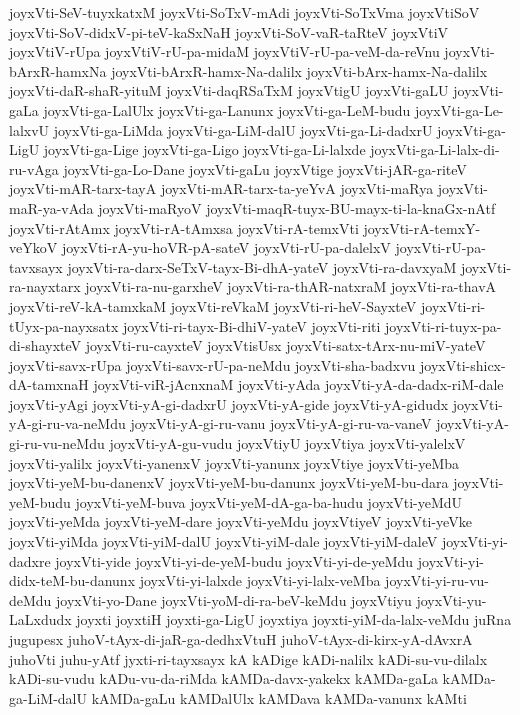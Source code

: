 {joyxVti-SeV-tuyxkatxM
joyxVti-SoTxV-mAdi
joyxVti-SoTxVma
joyxVtiSoV
joyxVti-SoV-didxV-pi-teV-kaSxNaH
joyxVti-SoV-vaR-taRteV
joyxVtiV
joyxVtiV-rUpa
joyxVtiV-rU-pa-midaM
joyxVtiV-rU-pa-veM-da-reVnu
joyxVti-bArxR-hamxNa
joyxVti-bArxR-hamx-Na-dalilx
joyxVti-bArx-hamx-Na-dalilx
joyxVti-daR-shaR-yituM
joyxVti-daqRSaTxM
joyxVtigU
joyxVti-gaLU
joyxVti-gaLa
joyxVti-ga-LalUlx
joyxVti-ga-Lanunx
joyxVti-ga-LeM-budu
joyxVti-ga-Le-lalxvU
joyxVti-ga-LiMda
joyxVti-ga-LiM-dalU
joyxVti-ga-Li-dadxrU
joyxVti-ga-LigU
joyxVti-ga-Lige
joyxVti-ga-Ligo
joyxVti-ga-Li-lalxde
joyxVti-ga-Li-lalx-di-ru-vAga
joyxVti-ga-Lo-Dane
joyxVti-gaLu
joyxVtige
joyxVti-jAR-ga-riteV
joyxVti-mAR-tarx-tayA
joyxVti-mAR-tarx-ta-yeYvA
joyxVti-maRya
joyxVti-maR-ya-vAda
joyxVti-maRyoV
joyxVti-maqR-tuyx-BU-mayx-ti-la-knaGx-nAtf
joyxVti-rAtAmx
joyxVti-rA-tAmxsa
joyxVti-rA-temxVti
joyxVti-rA-temxY-veYkoV
joyxVti-rA-yu-hoVR-pA-sateV
joyxVti-rU-pa-dalelxV
joyxVti-rU-pa-tavxsayx
joyxVti-ra-darx-SeTxV-tayx-Bi-dhA-yateV
joyxVti-ra-davxyaM
joyxVti-ra-nayxtarx
joyxVti-ra-nu-garxheV
joyxVti-ra-thAR-natxraM
joyxVti-ra-thavA
joyxVti-reV-kA-tamxkaM
joyxVti-reVkaM
joyxVti-ri-heV-SayxteV
joyxVti-ri-tUyx-pa-nayxsatx
joyxVti-ri-tayx-Bi-dhiV-yateV
joyxVti-riti
joyxVti-ri-tuyx-pa-di-shayxteV
joyxVti-ru-cayxteV
joyxVtisUsx
joyxVti-satx-tArx-nu-miV-yateV
joyxVti-savx-rUpa
joyxVti-savx-rU-pa-neMdu
joyxVti-sha-badxvu
joyxVti-shicx-dA-tamxnaH
joyxVti-viR-jAcnxnaM
joyxVti-yAda
joyxVti-yA-da-dadx-riM-dale
joyxVti-yAgi
joyxVti-yA-gi-dadxrU
joyxVti-yA-gide
joyxVti-yA-gidudx
joyxVti-yA-gi-ru-va-neMdu
joyxVti-yA-gi-ru-vanu
joyxVti-yA-gi-ru-va-vaneV
joyxVti-yA-gi-ru-vu-neMdu
joyxVti-yA-gu-vudu
joyxVtiyU
joyxVtiya
joyxVti-yalelxV
joyxVti-yalilx
joyxVti-yanenxV
joyxVti-yanunx
joyxVtiye
joyxVti-yeMba
joyxVti-yeM-bu-danenxV
joyxVti-yeM-bu-danunx
joyxVti-yeM-bu-dara
joyxVti-yeM-budu
joyxVti-yeM-buva
joyxVti-yeM-dA-ga-ba-hudu
joyxVti-yeMdU
joyxVti-yeMda
joyxVti-yeM-dare
joyxVti-yeMdu
joyxVtiyeV
joyxVti-yeVke
joyxVti-yiMda
joyxVti-yiM-dalU
joyxVti-yiM-dale
joyxVti-yiM-daleV
joyxVti-yi-dadxre
joyxVti-yide
joyxVti-yi-de-yeM-budu
joyxVti-yi-de-yeMdu
joyxVti-yi-didx-teM-bu-danunx
joyxVti-yi-lalxde
joyxVti-yi-lalx-veMba
joyxVti-yi-ru-vu-deMdu
joyxVti-yo-Dane
joyxVti-yoM-di-ra-beV-keMdu
joyxVtiyu
joyxVti-yu-LaLxdudx
joyxti
joyxtiH
joyxti-ga-LigU
joyxtiya
joyxti-yiM-da-lalx-veMdu
juRna
jugupesx
juhoV-tAyx-di-jaR-ga-dedhxVtuH
juhoV-tAyx-di-kirx-yA-dAvxrA
juhoVti
juhu-yAtf
jyxti-ri-tayxsayx
kA
kADige
kADi-nalilx
kADi-su-vu-dilalx
kADi-su-vudu
kADu-vu-da-riMda
kAMDa-davx-yakekx
kAMDa-gaLa
kAMDa-ga-LiM-dalU
kAMDa-gaLu
kAMDalUlx
kAMDava
kAMDa-vanunx
kAMti
}
